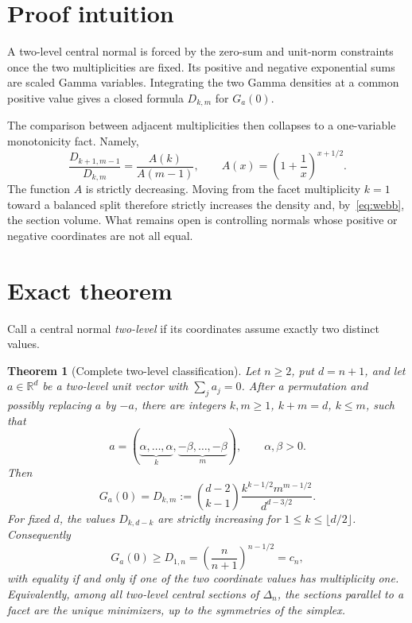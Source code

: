\documentclass[11pt]{article}
\newtheorem{theorem}{Theorem}
\newcommand{\R}{\mathbb R}
\begin{document}
\section{Proof intuition}

A two-level central normal is forced by the zero-sum and unit-norm constraints
once the two multiplicities are fixed.  Its positive and negative exponential
sums are scaled Gamma variables.  Integrating the two Gamma densities at a
common positive value gives a closed formula $D_{k,m}$ for $G_a(0)$.

The comparison between adjacent multiplicities then collapses to a
one-variable monotonicity fact.  Namely,
\[
 \frac{D_{k+1,m-1}}{D_{k,m}}
 =\frac{A(k)}{A(m-1)},\qquad
 A(x)=\left(1+\frac1x\right)^{x+1/2}.
\]
The function $A$ is strictly decreasing.  Moving from the facet multiplicity
$k=1$ toward a balanced split therefore strictly increases the density and,
by~\eqref{eq:webb}, the section volume.  What remains open is controlling
normals whose positive or negative coordinates are not all equal.

\section{Exact theorem}

Call a central normal \emph{two-level} if its coordinates assume exactly two
distinct values.

\begin{theorem}[Complete two-level classification]\label{thm:main}
Let $n\geq2$, put $d=n+1$, and let $a\in\R^d$ be a two-level unit vector with
$\sum_ja_j=0$.  After a permutation and possibly replacing $a$ by $-a$, there
are integers $k,m\geq1$, $k+m=d$, $k\leq m$, such that
\[
 a=(\underbrace{\alpha,\ldots,\alpha}_{k},
    \underbrace{-\beta,\ldots,-\beta}_{m}),
 \qquad \alpha,\beta>0.
\]
Then
\begin{equation}\label{eq:Dkm}
 G_a(0)=D_{k,m}:=\binom{d-2}{k-1}
 \frac{k^{k-1/2}m^{m-1/2}}{d^{d-3/2}}.
\end{equation}
For fixed $d$, the values $D_{k,d-k}$ are strictly increasing for
$1\leq k\leq\lfloor d/2\rfloor$.  Consequently
\[
 G_a(0)\geq D_{1,n}=\left(\frac n{n+1}\right)^{n-1/2}=c_n,
\]
with equality if and only if one of the two coordinate values has
multiplicity one.  Equivalently, among all two-level central sections of
$\Delta_n$, the sections parallel to a facet are the unique minimizers, up to
the symmetries of the simplex.
\end{theorem}
\end{document}
